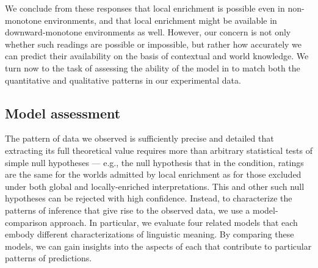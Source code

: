 \documentclass[leqno,12pt]{article}
\begin{document}
We conclude from these responses that local enrichment is possible
even in non-monotone environments, and that local enrichment might be
available in downward-monotone environments as well. However, our
concern is not only whether such readings are possible or impossible,
but rather how accurately we can predict their availability on the
basis of contextual and world knowledge.  We turn now to the task of
assessing the ability of the model in  to match both
the quantitative and qualitative patterns in our experimental data.


\subsection{Model assessment}\label{sec:binary:assess}

The pattern of data we observed is sufficiently precise and detailed
that extracting its full theoretical value requires more than
arbitrary statistical tests of simple null hypotheses --- e.g., the null
hypothesis that in the  condition, ratings
are the same for the worlds admitted by local enrichment as for those
excluded under both global and locally-enriched interpretations.  This
and other such null hypotheses can be rejected with high confidence.
Instead, to characterize the patterns of inference that give rise to
the observed data, we use a model-comparison approach. In particular,
we evaluate four related models that each embody different
characterizations of linguistic meaning. By comparing these models, we
can gain insights into the aspects of each that contribute to
particular patterns of predictions.
\end{document}
